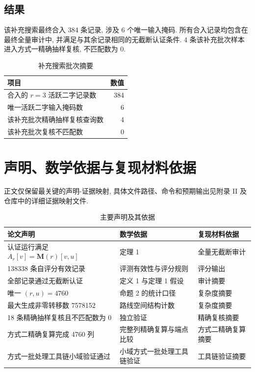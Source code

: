 \documentclass[UTF8,a4paper,zihao=-4,fontset=fandol]{ctexart}
\numberwithin{equation}{section}
\theoremstyle{definition}
\theoremstyle{plain}
\theoremstyle{remark}
\begin{document}
\subsection{结果}

该补充搜索最终合入 384 条记录, 涉及 6 个唯一输入掩码. 所有合入记录均包含在最终全量审计中, 并满足与其余记录相同的无截断认证条件. 4 条该补充批次样本进入方式一精确抽样复核, 不匹配数为 0.

\begin{table}[H]
\centering
\caption{补充搜索批次摘要}
\label{tab:e06}
\begin{tabular}{lr}
\toprule
项目 & 数值 \\
\midrule
合入的 $r=3$ 活跃二字记录数 & 384 \\
唯一活跃二字输入掩码数 & 6 \\
该补充批次精确抽样复核查询数 & 4 \\
该补充批次复核不匹配数 & 0 \\
\bottomrule
\end{tabular}
\end{table}

\section{声明、数学依据与复现材料依据}

正文仅保留最关键的声明-证据映射, 具体文件路径、命令和预期输出见附录 II 及仓库中的详细证据映射文件.

\begin{table}[H]
\centering
\caption{主要声明及其依据}
\label{tab:claims}
\begin{tabularx}{\textwidth}{L L L}
\toprule
论文声明 & 数学依据 & 复现材料依据 \\
\midrule
认证运行满足 $A_r[v]=\bm{M}(r)[v,u]$ & 定理 1 & 全量无截断审计 \\
138338 条自评分有效记录 & 评测有效性与评分规则 & 评分输出 \\
全部记录通过无截断认证 & 定义 1 与定理 1 假设 & 审计摘要 \\
唯一 $(r,u)=4760$ & 命题 2 的统计口径 & 复杂度摘要 \\
最大生成非零转移数 7578152 & 路线空间结构计数 & 复杂度摘要 \\
18 条精确抽样复核且不匹配数为 0 & 独立验证 & 精确复核摘要 \\
方式二精确复算完成 4760 列 & 完整列精确复算与端点比较 & 方式二精确复算摘要 \\
方式一批处理工具链小域验证通过 & 小域方式一批处理工具链验证 & 工具链验证摘要 \\
\bottomrule
\end{tabularx}
\end{table}
\end{document}
